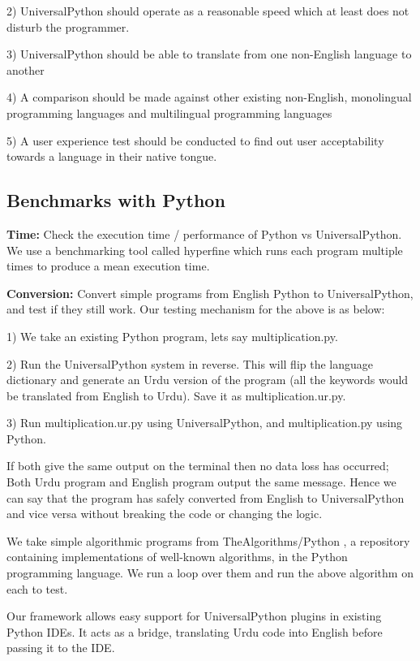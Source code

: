\documentclass[conference]{IEEEtran}
\begin{document}
2) UniversalPython should operate as a reasonable speed which at least does not disturb the programmer.

3) UniversalPython should be able to translate from one non-English language to another

4) A comparison should be made against other existing non-English, monolingual programming languages and multilingual programming languages

5) A user experience test should be conducted to find out user acceptability towards a language in their native tongue.

\subsection{Benchmarks with Python}\label{BB}

\textbf{Time:} Check the execution time / performance of Python vs UniversalPython. We use a benchmarking tool called hyperfine which runs each program multiple times to produce a mean execution time.

\textbf{Conversion:} Convert simple programs from English Python to UniversalPython, and test if they still work. Our testing mechanism for the above is as below:

1) We take an existing Python program, lets say multiplication.py.

2) Run the UniversalPython system in reverse. This will flip the language dictionary and generate an Urdu version of the program (all the keywords would be translated from English to Urdu). Save it as multiplication.ur.py.

3) Run multiplication.ur.py using UniversalPython, and multiplication.py using Python.

If both give the same output on the terminal then no data loss has occurred; Both Urdu program and English program output the same message. Hence we can say that the program has safely converted from English to UniversalPython and vice versa without breaking the code or changing the logic.

We take simple algorithmic programs from TheAlgorithms/Python \cite{thealgorithms_python}, a repository containing implementations of well-known algorithms, in the Python programming language. We run a loop over them and run the above algorithm on each to test.

Our framework allows easy support for UniversalPython plugins in existing Python IDEs. It acts as a bridge, translating Urdu code into English before passing it to the IDE.
\end{document}
